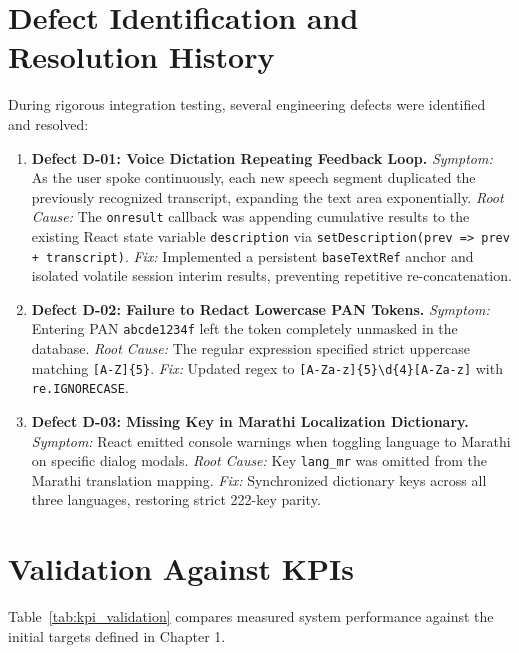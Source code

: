 \section{Defect Identification and Resolution History}
During rigorous integration testing, several engineering defects were identified and resolved:
\begin{enumerate}
    \item \textbf{Defect D-01: Voice Dictation Repeating Feedback Loop.}
    \textit{Symptom:} As the user spoke continuously, each new speech segment duplicated the previously recognized transcript, expanding the text area exponentially.
    \textit{Root Cause:} The \texttt{onresult} callback was appending cumulative results to the existing React state variable \texttt{description} via \texttt{setDescription(prev => prev + transcript)}.
    \textit{Fix:} Implemented a persistent \texttt{baseTextRef} anchor and isolated volatile session interim results, preventing repetitive re-concatenation.
    \item \textbf{Defect D-02: Failure to Redact Lowercase PAN Tokens.}
    \textit{Symptom:} Entering PAN \texttt{abcde1234f} left the token completely unmasked in the database.
    \textit{Root Cause:} The regular expression specified strict uppercase matching \texttt{[A-Z]\{5\}}.
    \textit{Fix:} Updated regex to \texttt{[A-Za-z]\{5\}\textbackslash d\{4\}[A-Za-z]} with \texttt{re.IGNORECASE}.
    \item \textbf{Defect D-03: Missing Key in Marathi Localization Dictionary.}
    \textit{Symptom:} React emitted console warnings when toggling language to Marathi on specific dialog modals.
    \textit{Root Cause:} Key \texttt{lang\_mr} was omitted from the Marathi translation mapping.
    \textit{Fix:} Synchronized dictionary keys across all three languages, restoring strict 222-key parity.
\end{enumerate}

\section{Validation Against KPIs}
Table~\ref{tab:kpi_validation} compares measured system performance against the initial targets defined in Chapter 1.

